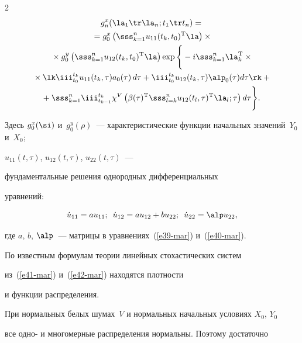 \begin{multicols}{2}
\begin{multline}
g_n^x (\la_1\tr \la_n; t_1\tr t_n) ={}\\


{}= g_0^x \left( \sss_{k=1}^n u_{11}(t_k, t_0)^{\mathrm{T}}\la\right)\times{}\\


{}\times  g_0^y \left( \sss_{k=1}^n u_{12}(t_k, t_0)^{\mathrm{T}}\la\right)\exp\Bigg\{ -i \sss_{k=1}^n \la_k^{\mathrm{T}} \times{}\\


{}\times \lk \iii_{t_0}^{t_k} u_{11} (t_k,\tau) a_0 (\tau) \,d\tau + \iii_{t_0}^{t_k} u_{12} (t_k,\tau) \alp_0 (\tau) d\tau\rk+{}\\


\!\!\!{}+ \sss_{k=1}^n \iii_{t_{k-1}}^{t_k} \chi^V \left( \beta(\tau)^{\mathrm{T}} \sss_{l=k}^n u_{12} (t_l,\tau)^{\mathrm{T}} 


\la_l;\tau\right)d\tau\Bigg\}.\!


\label{e41-mar}


\end{multline}


Здесь $g_0^x (\si)$ и~$g_0^y(\rho)$~--- характеристические функции начальных значений~$Y_0$ и~$X_0$;


$u_{11}(t,\tau)$, $u_{12}(t,\tau)$, $u_{22}(t,\tau)$~--- 


фундаментальные решения однородных дифференциальных


уравнений:


\begin{equation}


\dot u_{11} = a u_{11};\enskip


\dot  u_{12} = a u_{12}+b u_{22};\enskip


\dot u_{22} = \alp u_{22},\label{e42-mar}


\end{equation}


где $a$, $b$, $\alp$~--- матрицы в уравнениях~(\ref{e39-mar}) и~(\ref{e40-mar}).


По известным формулам теории линейных стохастических сис\-тем~\cite{11-mar} 


из~(\ref{e41-mar}) и~(\ref{e42-mar}) находятся плотности


и функции распределения.





При нормальных белых шумах~$V$ и нормальных начальных условиях $X_0$, $Y_0$


все одно- и многомерные распределения нормальны. Поэтому достаточно 



\end{multicols}
